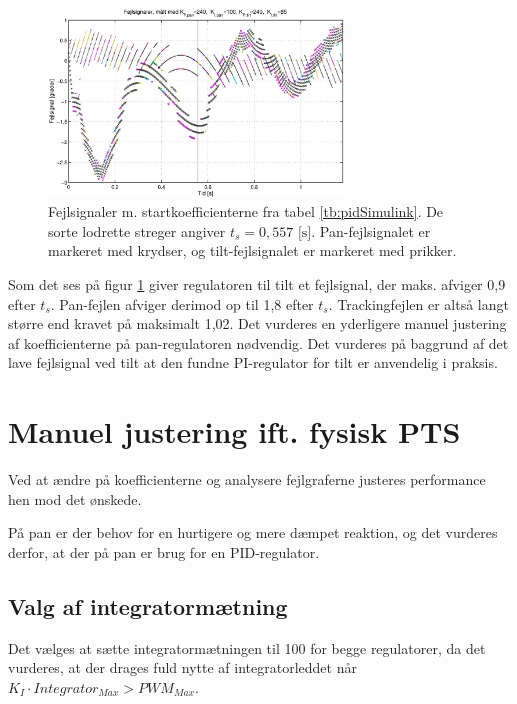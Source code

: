\begin{figure}[h!]
\centering
\includegraphics[width=0.7\textwidth]{./graphics/pidPhys1.eps}
\captionsetup{width=0.6\textwidth}
\caption[Fejlsignaler m. startkoefficienter]{Fejlsignaler m. startkoefficienterne fra tabel \ref{tb:pidSimulink}.
	De sorte lodrette streger angiver \(t_s=0,557 \text{ [s]}\).
	Pan-fejlsignalet er markeret med krydser, og tilt-fejlsignalet er markeret med prikker.} 
\label{fig:pidPhys1}
\end{figure}


Som det ses på figur \ref{fig:pidPhys1} giver regulatoren til tilt et fejlsignal,
der maks. afviger 0,9\degree{} efter \(t_s\).
Pan-fejlen afviger derimod op til 1,8\degree{} efter \(t_s\).
Trackingfejlen er altså langt større end kravet på maksimalt 1,02\degree.
Det vurderes en yderligere manuel justering af koefficienterne på pan-regulatoren nødvendig.
Det vurderes på baggrund af det lave fejlsignal ved tilt at den fundne
PI-regulator for tilt er anvendelig i praksis.


\section{Manuel justering ift. fysisk PTS}
Ved at ændre på koefficienterne og analysere fejlgraferne justeres performance 
hen mod det ønskede.

På pan er der behov for en hurtigere og mere dæmpet reaktion,
og det vurderes derfor, at der på pan er brug for en PID-regulator.

\subsection{Valg af integratormætning}
Det vælges at sætte integratormætningen til 100 for begge regulatorer, da det vurderes, at der drages
fuld nytte af integratorleddet når \( K_I \cdot Integrator_{Max} > PWM_{Max} \).

